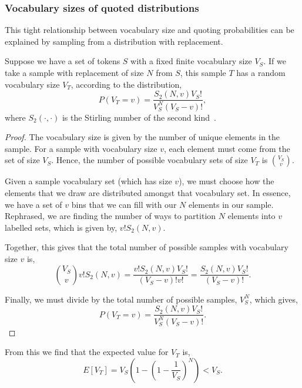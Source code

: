 \subsubsection{Vocabulary sizes of quoted distributions}
This tight relationship between vocabulary size and quoting probabilities can be explained by sampling from a distribution with replacement. 
\begin{theorem}
Suppose we have a set of tokens $S$ with a fixed finite vocabulary size $V_S$. If we take a sample with replacement of size $N$ from $S$, this sample $T$ has a random vocabulary size $V_T$, according to the distribution,
$$P(V_T = v) = \frac{S_{2}(N, v) V_S!}{V_S^{N}(V_S-v)!},$$
where $S_2(\cdot, \cdot)$ is the Stirling number of the second kind~\cite{graham_concrete_1989}.
\end{theorem}
\begin{proof} %
The vocabulary size is given by the number of unique elements in the sample. For a sample with vocabulary size $v$, each element must come from the set of size $V_S$. Hence, the number of possible vocabulary sets of size $V_T$ is $\binom{V_S}{v}$.


Given a sample vocabulary set (which has size $v$), we must choose how the elements that we draw are distributed amongst that vocabulary set. In essence, we have a set of $v$ bins that we can fill with our $N$ elements in our sample. Rephrased, we are finding the number of ways to partition $N$ elements into $v$ labelled sets, which is given by, $v! S_2(N, v).$


Together, this gives that the total number of possible samples with vocabulary size $v$ is,
$$ \binom{V_S}{v} v! S_2(N, v) =  \frac{ v! S_2(N, v) V_S! }{(V_S - v)! v!} = \frac{S_2(N, v) V_S! }{(V_S - v)!}.$$

Finally, we must divide by the total number of possible samples, $V_S^N$, which gives,
$$P(V_T = v) = \frac{S_{2}(N, v) V_S!}{V_S^{N}(V_S-v)!}.$$
\end{proof}


From this we find that the expected value for $V_T$ is,
$$E\left[V_T \right] = V_S\left(1-\left(1-\frac{1}{V_S}\right)^{N}\right) < V_S.$$ 

